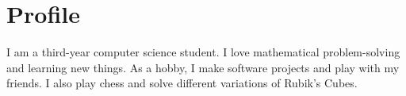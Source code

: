 \section*{Profile}

I am a third-year computer science student. I love mathematical
problem-solving and learning new things. As a hobby, I make software projects
and play with my friends. I also play chess and solve different variations of
Rubik's Cubes.
